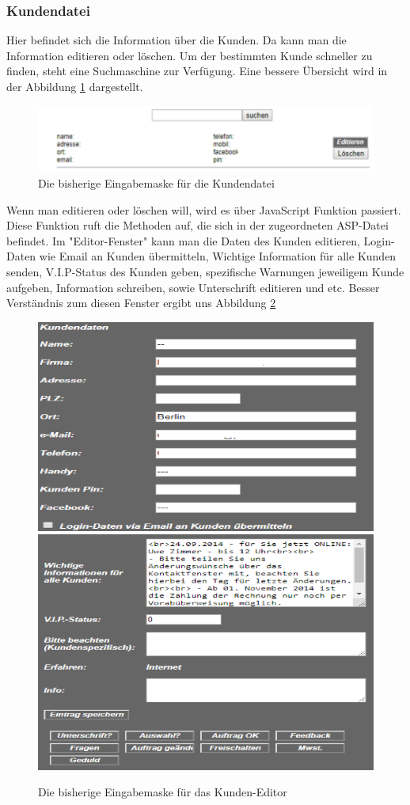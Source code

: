 \pagebreak
\subsubsection{Kundendatei}

Hier befindet sich die Information über die Kunden. Da kann man die Information editieren oder löschen. Um der bestimmten Kunde schneller zu finden, steht eine Suchmaschine zur Verfügung. Eine bessere Übersicht wird in der Abbildung \ref{fig:KundenDatei} dargestellt. 

\begin{figure}[h]
	\centering
	\includegraphics[width=0.7\linewidth]{Graphics/kundenDatei.png}
	\caption[Kundeansicht]{Die bisherige Eingabemaske für die Kundendatei}
	\label{fig:KundenDatei}
\end{figure}

Wenn man editieren oder löschen will, wird es über JavaScript Funktion passiert. Diese Funktion ruft die Methoden auf, die sich in der zugeordneten ASP-Datei befindet. Im "Editor-Fenster" kann man die Daten des Kunden editieren, Login-Daten wie Email an Kunden übermitteln, Wichtige Information für alle Kunden senden, V.I.P-Status des Kunden geben, spezifische Warnungen jeweiligem Kunde aufgeben, Information schreiben, sowie Unterschrift editieren und etc. Besser Verständnis zum diesen Fenster ergibt uns Abbildung \ref{fig:Kunden Editor}


\pagebreak

\begin{figure}[h]
	\centering
	\includegraphics[width=0.7\linewidth]{Graphics/kundeEditieren.png}
	\includegraphics[width=0.7\linewidth]{Graphics/kundeEditieren1.png}
	\caption[Kundeansicht]{Die bisherige Eingabemaske für das Kunden-Editor}
	\label{fig:Kunden Editor}
\end{figure}


